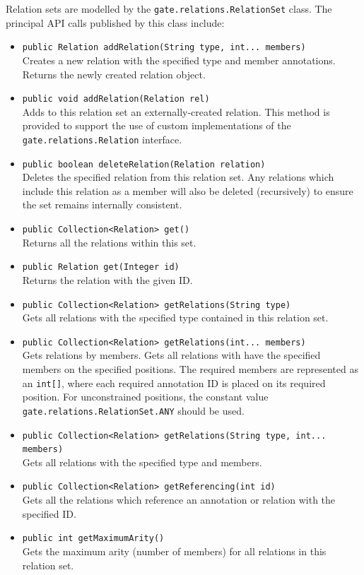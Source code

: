 Relation sets are modelled by the \lstinline!gate.relations.RelationSet! class.
The principal API calls published by this class include:
\begin{itemize}
\item \lstinline!public Relation addRelation(String type, int... members)!\\
  Creates a new relation with the specified type and member annotations. Returns
  the newly created relation object.
\item \lstinline!public void addRelation(Relation rel)!\\
  Adds to this relation set an externally-created relation. This method is
  provided to support the use of custom implementations of the 
  \lstinline!gate.relations.Relation! interface.
\item \lstinline!public boolean deleteRelation(Relation relation)! \\
  Deletes the specified relation from this relation set. Any relations which
  include this relation as a member will also be deleted (recursively) to
  ensure the set remains internally consistent.
\item \lstinline!public Collection<Relation> get()!\\
  Returns all the relations within this set.
\item \lstinline!public Relation get(Integer id)!\\
  Returns the relation with the given ID.
\item \lstinline!public Collection<Relation> getRelations(String type)!\\
  Gets all relations with the specified type contained in this relation set.
\item \lstinline!public Collection<Relation> getRelations(int... members)!\\
  Gets relations by members. Gets all relations with have the specified members
  on the specified positions. The required members are represented as an
  \lstinline!int[]!, where each required annotation ID is placed on its required
  position. For unconstrained positions, the constant value
  \lstinline!gate.relations.RelationSet.ANY! should be used.
\item 
\lstinline!public Collection<Relation> getRelations(String type, int... members)!\\
  Gets all relations with the specified type and members.
\item \lstinline!public Collection<Relation> getReferencing(int id)!\\
  Gets all the relations which reference an annotation or relation with the
  specified ID.
\item \lstinline!public int getMaximumArity()!\\
  Gets the maximum arity (number of members) for all relations in this relation
  set.
\end{itemize}

